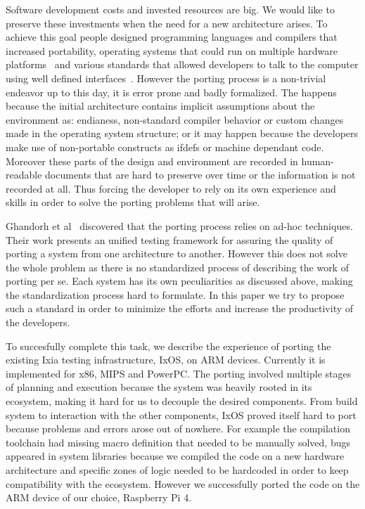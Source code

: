\documentclass[12pt,a4paper]{report}
\begin{document}
Software development costs and invested resources are big. We would like to preserve these
investments when the need for a new architecture arises. To achieve this goal people designed
programming languages and compilers that increased portability, operating systems that could run
on multiple hardware platforms~\cite{johnson1978unix} and various standards that allowed developers
to talk to the computer using well defined interfaces~\cite{walli1995posix}. However the porting
process is a non-trivial endeavor up to this day, it is error prone and badly formalized. The
happens because the initial architecture contains implicit assumptions about the environment as:
endianess, non-standard compiler behavior or custom changes made in the operating system structure;
or it may happen because the developers make use of non-portable constructs as ifdefs
\cite{spencer1992ifdef} or machine dependant code. Moreover these parts of the design and
environment are recorded in human-readable documents that are hard to preserve over time or the
information is not recorded at all. Thus forcing the developer to rely on its own experience and
skills in order to solve the porting problems that will arise.

Ghandorh et al~\cite{ghandorh2020systematic} discovered that the porting process relies on ad-hoc
techniques. Their work presents an unified testing framework for assuring the quality of porting
a system from one architecture to another. However this does not solve the whole problem as there
is no standardized process of describing the work of porting per se. Each system has its own
peculiarities as discussed above, making the standardization process hard to formulate. In this
paper we try to propose such a standard in order to minimize the efforts and increase the
productivity of the developers.

To succesfully complete this task, we describe the experience of porting the existing Ixia testing
infrastructure, IxOS, on ARM devices. Currently it is implemented for x86, MIPS and PowerPC. The
porting involved multiple stages of planning and execution because the system was heavily rooted
in its ecosystem, making it hard for us to decouple the desired components. From build system to
interaction with the other components, IxOS proved itself hard to port because problems and errors
arose out of nowhere. For example the compilation toolchain had missing macro definition that needed
to be manually solved, bugs appeared in system libraries because we compiled the code on a new
hardware architecture and specific zones of logic needed to be hardcoded in order to keep
compatibility with the ecosystem. However we successfully ported the code on the ARM device of our
choice, Raspberry Pi 4.
\end{document}
